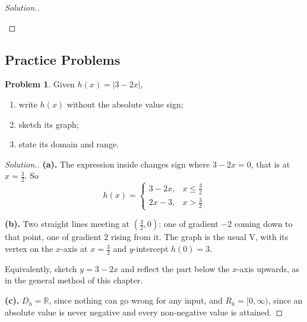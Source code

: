 \documentclass[11pt,a4paper]{article}
\theoremstyle{definition}
\newtheorem{problemx}{Problem}[section]
\newenvironment{problem}{\begin{problemx}}{\end{problemx}}
\newenvironment{solution}
  {\renewcommand{\qedsymbol}{}\begin{proof}[\textit{Solution}.]}
  {\end{proof}}
\begin{document}
\begin{solution}
\begin{enumerate}
\begin{enumerate}
\begin{figure}[H]
\centering
{}
\end{figure}
\end{enumerate}
\end{enumerate}
\end{solution}
\pagebreak

\subsection{Practice Problems}

\begin{problem}
Given $h(x)=\left|3-2x\right|$,
\begin{enumerate}
\item[(a).] write $h(x)$ without the absolute value sign;
\item[(b).] sketch its graph;
\item[(c).] state its domain and range.
\end{enumerate}
\end{problem}

\begin{solution}
\textbf{(a).} The expression inside changes sign where $3-2x=0$, that is at
$x=\frac{3}{2}$. So
$$h(x)=\begin{cases}
3-2x, & x\leq \tfrac{3}{2}\\[2pt]
2x-3, & x>\tfrac{3}{2}
\end{cases}$$

\textbf{(b).} Two straight lines meeting at $\left(\frac{3}{2},0\right)$: one of
gradient $-2$ coming down to that point, one of gradient $2$ rising from it. The
graph is the usual V, with its vertex on the $x$-axis at $x=\frac{3}{2}$ and
$y$-intercept $h(0)=3$.

Equivalently, sketch $y=3-2x$ and reflect the part below the $x$-axis upwards, as
in the general method of this chapter.

\textbf{(c).} $D_h=\mathbb{R}$, since nothing can go wrong for any input, and
$R_h=[0,\infty)$, since an absolute value is never negative and every non-negative
value is attained.
\end{solution}
\end{document}
